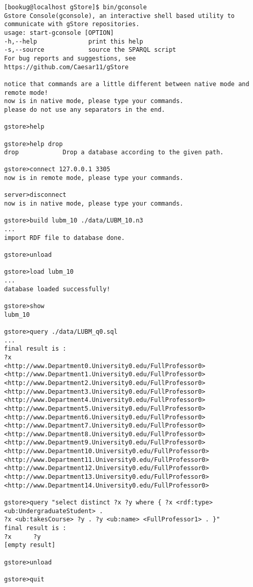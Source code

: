 \documentclass[titlepage, a4paper, 12pt]{article}
\begin{document}
\begin{verbatim}
[bookug@localhost gStore]$ bin/gconsole
Gstore Console(gconsole), an interactive shell based utility to communicate with gStore repositories.
usage: start-gconsole [OPTION]
-h,--help              print this help
-s,--source            source the SPARQL script
For bug reports and suggestions, see https://github.com/Caesar11/gStore

notice that commands are a little different between native mode and remote mode!
now is in native mode, please type your commands.
please do not use any separators in the end.

gstore>help

gstore>help drop
drop            Drop a database according to the given path.

gstore>connect 127.0.0.1 3305
now is in remote mode, please type your commands.

server>disconnect
now is in native mode, please type your commands.

gstore>build lubm_10 ./data/LUBM_10.n3
...
import RDF file to database done.

gstore>unload

gstore>load lubm_10
...
database loaded successfully!

gstore>show
lubm_10

gstore>query ./data/LUBM_q0.sql
...
final result is :
?x
<http://www.Department0.University0.edu/FullProfessor0>
<http://www.Department1.University0.edu/FullProfessor0>
<http://www.Department2.University0.edu/FullProfessor0>
<http://www.Department3.University0.edu/FullProfessor0>
<http://www.Department4.University0.edu/FullProfessor0>
<http://www.Department5.University0.edu/FullProfessor0>
<http://www.Department6.University0.edu/FullProfessor0>
<http://www.Department7.University0.edu/FullProfessor0>
<http://www.Department8.University0.edu/FullProfessor0>
<http://www.Department9.University0.edu/FullProfessor0>
<http://www.Department10.University0.edu/FullProfessor0>
<http://www.Department11.University0.edu/FullProfessor0>
<http://www.Department12.University0.edu/FullProfessor0>
<http://www.Department13.University0.edu/FullProfessor0>
<http://www.Department14.University0.edu/FullProfessor0>

gstore>query "select distinct ?x ?y where { ?x <rdf:type>
<ub:UndergraduateStudent> .
?x <ub:takesCourse> ?y . ?y <ub:name> <FullProfessor1> . }"
final result is :
?x      ?y
[empty result]

gstore>unload

gstore>quit
\end{verbatim}
\end{document}
